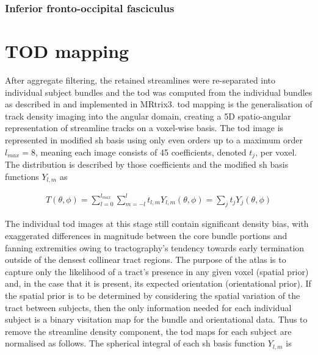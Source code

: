 \subsubsection{Inferior fronto-occipital fasciculus}


\section{TOD mapping}



After aggregate filtering, the retained streamlines were re-separated into individual subject bundles and the \gls{tod} was computed from the individual bundles as described in \textcite{Dhollander2014} and implemented in MRtrix3. \autocite{Tournier2019}
\gls{tod} mapping is the generalisation of track density imaging into the angular domain, creating a 5D spatio-angular representation of streamline tracks on a voxel-wise basis.
The \gls{tod} image is represented in modified \gls{sh} basis \autocite{Descoteaux2006} using only even orders up to a maximum order $l_{max}=8$, meaning each image consists of 45 coefficients, denoted $t_j$, per voxel.
The distribution is described by those coefficients and the modified \gls{sh} basis functions $Y_{l,m}$ \autocite{Descoteaux2006} as

\begin{align}
  T(\theta, \phi) = \sum_{l=0}^{l_{max}} \sum_{m=-l}^l t_{l,m} Y_{l,m}(\theta, \phi) = \sum_j t_jY_j(\theta, \phi)
\end{align}

The individual \gls{tod} images at this stage still contain significant density bias, with exaggerated differences in magnitude between the core bundle portions and fanning extremities owing to tractography's tendency towards early termination outside of the densest collinear tract regions.\autocite{Rheault2020,Smith2013}
The purpose of the atlas is to capture only the likelihood of a tract's presence in any given voxel (spatial prior) and, in the case that it is present, its expected orientation (orientational prior).
If the spatial prior is to be determined by considering the spatial variation of the tract between subjects, then the only information needed for each individual subject is a binary visitation map for the bundle and orientational data.
Thus to remove the streamline density component, the \gls{tod} maps for each subject are normalised as follows.
The spherical integral of each \gls{sh} basis function $Y_{l,m}$ is

